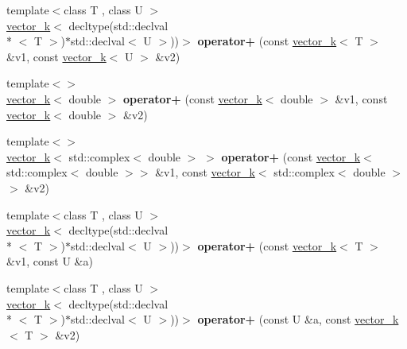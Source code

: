 \begin{DoxyCompactItemize}
\item 
\hypertarget{namespacekeycpp_aa865f0bd18bdefcf413b1c3dd286b998}{{\footnotesize template$<$class T , class U $>$ }\\\hyperlink{classkeycpp_1_1vector__k}{vector\-\_\-k}$<$ decltype(std\-::declval\\*
$<$ T $>$)$\ast$std\-::declval$<$ U $>$))$>$ {\bfseries operator+} (const \hyperlink{classkeycpp_1_1vector__k}{vector\-\_\-k}$<$ T $>$ \&v1, const \hyperlink{classkeycpp_1_1vector__k}{vector\-\_\-k}$<$ U $>$ \&v2)}\label{namespacekeycpp_aa865f0bd18bdefcf413b1c3dd286b998}

\item 
\hypertarget{namespacekeycpp_ae416b3cc307c30afdb62f0ed37b70e05}{{\footnotesize template$<$$>$ }\\\hyperlink{classkeycpp_1_1vector__k}{vector\-\_\-k}$<$ double $>$ {\bfseries operator+} (const \hyperlink{classkeycpp_1_1vector__k}{vector\-\_\-k}$<$ double $>$ \&v1, const \hyperlink{classkeycpp_1_1vector__k}{vector\-\_\-k}$<$ double $>$ \&v2)}\label{namespacekeycpp_ae416b3cc307c30afdb62f0ed37b70e05}

\item 
\hypertarget{namespacekeycpp_ade9508aa24d2496bd63dcdb72229c8b0}{{\footnotesize template$<$$>$ }\\\hyperlink{classkeycpp_1_1vector__k}{vector\-\_\-k}$<$ std\-::complex$<$ double $>$ $>$ {\bfseries operator+} (const \hyperlink{classkeycpp_1_1vector__k}{vector\-\_\-k}$<$ std\-::complex$<$ double $>$$>$ \&v1, const \hyperlink{classkeycpp_1_1vector__k}{vector\-\_\-k}$<$ std\-::complex$<$ double $>$$>$ \&v2)}\label{namespacekeycpp_ade9508aa24d2496bd63dcdb72229c8b0}

\item 
\hypertarget{namespacekeycpp_a68fe0fe851bce021be6a0609da7df82d}{{\footnotesize template$<$class T , class U $>$ }\\\hyperlink{classkeycpp_1_1vector__k}{vector\-\_\-k}$<$ decltype(std\-::declval\\*
$<$ T $>$)$\ast$std\-::declval$<$ U $>$))$>$ {\bfseries operator+} (const \hyperlink{classkeycpp_1_1vector__k}{vector\-\_\-k}$<$ T $>$ \&v1, const U \&a)}\label{namespacekeycpp_a68fe0fe851bce021be6a0609da7df82d}

\item 
\hypertarget{namespacekeycpp_af28312b8c309091f03e373e1ae5f3d46}{{\footnotesize template$<$class T , class U $>$ }\\\hyperlink{classkeycpp_1_1vector__k}{vector\-\_\-k}$<$ decltype(std\-::declval\\*
$<$ T $>$)$\ast$std\-::declval$<$ U $>$))$>$ {\bfseries operator+} (const U \&a, const \hyperlink{classkeycpp_1_1vector__k}{vector\-\_\-k}$<$ T $>$ \&v2)}\label{namespacekeycpp_af28312b8c309091f03e373e1ae5f3d46}


\end{DoxyCompactItemize}
